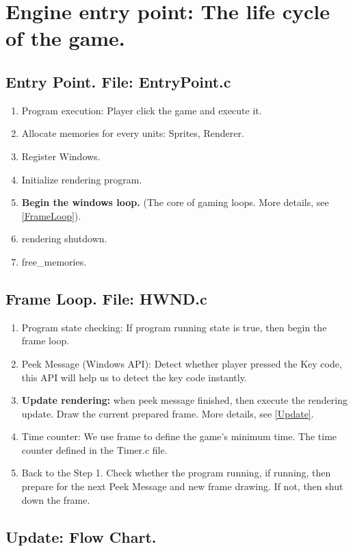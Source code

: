\section{Engine entry point: The life cycle of the game.}

\subsection{Entry Point. File: EntryPoint.c}
\begin{enumerate}[label = Step\arabic*]
	\item	Program execution: Player click the game and execute it.
	\item	Allocate memories for every units: Sprites, Renderer.
	\item	Register Windows.
	\item 	Initialize rendering program.
	\item 	\textbf{Begin the windows loop.} (The core of gaming loops. More details, see \ref{FrameLoop}).
	\item	rendering shutdown.
	\item	free\_memories.
\end{enumerate}

\subsection{Frame Loop. File: HWND.c}
\begin{enumerate}[label = Step\arabic*]\label{FrameLoop}
	\item 	Program state checking: If program running state is true, then begin the frame loop.
	\item	Peek Message (Windows API): Detect whether player pressed the Key code, this API will help us to detect the key code instantly.
	\item	\textbf{Update rendering:} when peek message finished, then execute the rendering update. Draw the current prepared frame. More details, see \ref{Update}.
	\item   Time counter: We use frame to define the game's minimum time. The time counter defined in the Timer.c file.
	\item   Back to the Step 1. Check whether the program running, if running, then prepare for the next Peek Message and new frame drawing. If not, then shut down the frame.
\end{enumerate}

\subsection{Update: Flow Chart.}


